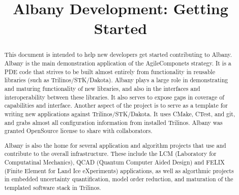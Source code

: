 \documentclass[pdf,12pt,report,strict]{SANDreport}
\title{Albany Development: Getting Started}
\date{}               %
\theoremstyle{remark}
\begin{document}
\maketitle

%
\begin{abstract}
This document is intended to help new developers get started
contributing to Albany. Albany is the main demonstration application
of the AgileComponets strategy. It is a PDE code that strives to be
built almost entirely from functionality in reusable libraries (such
as Trilinos/STK/Dakota). Albany plays a large role in demonstrating
and maturing functionality of new libraries, and also in the
interfaces and interoperability between these libraries. It also
serves to expose gaps in coverage of capabilities and
interface. Another aspect of the project is to serve as a template for
writing new applications against Trilinos/STK/Dakota. It uses CMake,
CTest, and git, and grabs almost all configuration information from
installed Trilinos. Albany was granted OpenSource license to share
with collaborators.

Albany is also the home for several application and algorithm
projects that use and contribute to the overall infrastructure.
These include the LCM (Laboratory for Computatinal Mechanics),
QCAD (Quantum Computer Aided Design) and FELIX (Finite Element for
Land Ice eXperiments) applications, as well as algorthmic projects
in embedded uncertainty quantification, model order reduction, and
maturation of the templated software stack in Trilinos.
\end{abstract}


%

%
\cleardoublepage            %
\tableofcontents
\listoffigures
\listoftables


%
%
\end{document}
